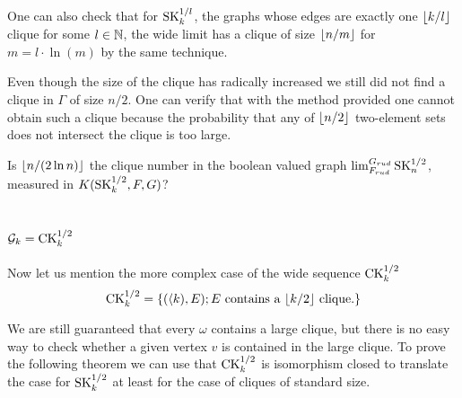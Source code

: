 One can also check that for $\text{SK}_{k}^{1/l}$, the graphs whose edges are exactly one $\left \lfloor {k/l} \right \rfloor$ clique for some $l\in \mathbb{N}$, the wide limit has a clique of size $\left \lfloor {n/m} \right \rfloor$ for $m=l\cdot \ln(m)$ by the same technique.

Even though the size of the clique has radically increased we still did not find a clique in $\Gamma$ of size $n/2$. One can verify that with the method provided one cannot obtain such a clique because the probability that any of $\left \lfloor {n/2} \right \rfloor$ two-element sets does not intersect the clique is too large. 

\begin{ques}
Is $\left \lfloor {n/(2\ln n)} \right \rfloor$ the clique number in the boolean valued graph $\lim_{F_{rud}}^{G_{rud}}\text{SK}_n^{1/2}$, measured in $K(\text{SK}_k^{1/2},F,G)$?
\end{ques}


\section{$\mathcal{G}_k=\text{CK}_k^{1/2}$}

Now let us mention the more complex case of the wide sequence $\text{CK}_k^{1/2}$
\[\text{CK}_k^{1/2}=\{(\langle k),E);E\text{ contains a $\left \lfloor {k/2} \right \rfloor$ clique.}\}\]

We are still guaranteed that every $\omega$ contains a large clique, but there is no easy way to check whether a given vertex $v$ is contained in the large clique. To prove the following theorem we can use that $\text{CK}_k^{1/2}$ is isomorphism closed to translate the case for $\text{SK}_k^{1/2}$ at least for the case of cliques of standard size.

